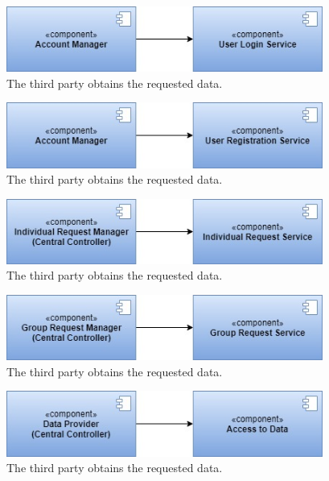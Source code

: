 \begin{figure}
    \centering
    \includegraphics[width=295pt]{images/IntegrationSequence/TrackMe-Integration_sequence11.jpg}
    \caption{The third party obtains the requested data.}
\end{figure}
\begin{figure}
    \centering
    \includegraphics[width=295pt]{images/IntegrationSequence/TrackMe-Integration_sequence12.jpg}
    \caption{The third party obtains the requested data.}
\end{figure}
\begin{figure}
    \centering
    \includegraphics[width=295pt]{images/IntegrationSequence/TrackMe-Integration_sequence13.jpg}
    \caption{The third party obtains the requested data.}
\end{figure}
\begin{figure}
    \centering
    \includegraphics[width=295pt]{images/IntegrationSequence/TrackMe-Integration_sequence14.jpg}
    \caption{The third party obtains the requested data.}
\end{figure}
\begin{figure}
    \centering
    \includegraphics[width=295pt]{images/IntegrationSequence/TrackMe-Integration_sequence15.jpg}
    \caption{The third party obtains the requested data.}
\end{figure}
